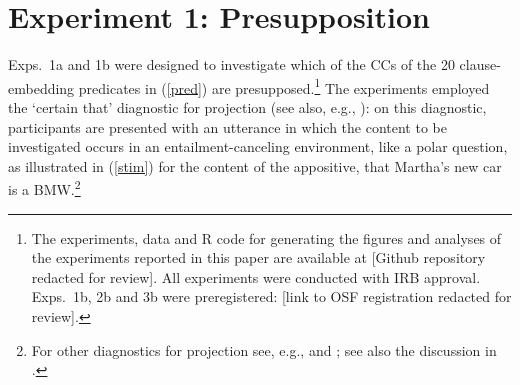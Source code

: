 \documentclass[11pt,fleqn]{article}
\newcommand{\6}{\mbox{$[\hspace*{-.6mm}[$}}
\newcommand{\9}{\mbox{$]\hspace*{-.6mm}]$}}
\begin{document}


%
%
%
%


\section{Experiment 1: Presupposition}\label{s2}

Exps.~1a and 1b were designed to investigate which of the CCs of the 20 clause-embedding predicates in (\ref{pred}) are presupposed.\footnote{\label{f-github}The experiments, data and R code for generating the figures and analyses of the experiments reported in this paper are available at [Github repository redacted for review]. All experiments were conducted with IRB approval. Exps.~1b, 2b and 3b were preregistered: [link to OSF registration redacted for review].}
The experiments employed the `certain that' diagnostic for projection (see also, e.g., \citealt{tonhauser-salt26,djaerv-bacovcin-salt27,stevens-etal2017,lorson2018,tbd-variability,mahler-nels,mahler2020,demarneffe-etal-sub23}): on this diagnostic, participants are presented with an utterance in which the content to be investigated occurs in an entailment-canceling environment, like a polar question, as illustrated in (\ref{stim}) for the content of the appositive, that Martha's new car is a BMW.\footnote{For other diagnostics for projection see, e.g., \citealt{smith-hall11,xue-onea11} and \citealt{brst-lang11}; see also the discussion in \citealt{tbd-variability}.} 
\end{document}
